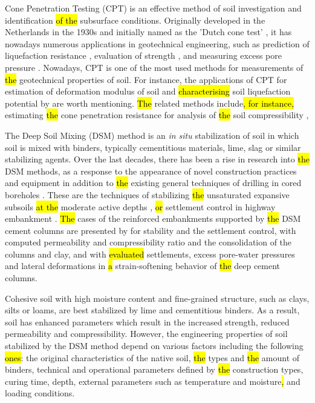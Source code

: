 \documentclass[final,3p,times,onecolumn,authoryear]{elsarticle}
\begin{document}
Cone Penetration Testing (CPT) is an effective method of soil investigation and identification \hl{of the }subsurface conditions. Originally developed in the Netherlands in the 1930s and initially named as the 'Dutch cone test' \citep{brouwer2007situ,mccallum_2014}, it has nowadays numerous applications in geotechnical engineering, such as prediction of liquefaction resistance \citep{Olsen,Fitzgerald,Saye}, evaluation of strength \citep{Priceetal2016,Jamiolkowski}, and measuring excess pore pressure \citep{SullyCampanella,Elsworthetal2006}. Nowadays, CPT is one of the most used methods for measurements of \hl{the }geotechnical properties of soil. For instance, the applications of CPT for estimation of deformation modulus of soil \citep{SHAHIEN2013633,BENZNAVARRETE2022289} and \hl{characterising} soil liquefaction potential by \cite{GUAN20221221} are worth mentioning. \hl{The }related methods include\hl{, for instance,} estimating \hl{the }cone penetration resistance for analysis of \hl{the }soil compressibility \citep{Bishtetal2021}, 

The Deep Soil Mixing (DSM) method is an \emph{in situ} stabilization of soil in which soil is mixed with binders, typically cementitious materials, lime, slag or similar stabilizing agents. Over the last decades, there has been a rise in research into \hl{the }DSM methods, as a response to the appearance of novel construction practices and equipment in addition to \hl{the }existing general techniques of drilling in cored boreholes \citep{Hepton}. These are the techniques of stabilizing \hl{the }unsaturated expansive subsoils \hl{at the} moderate active depths \citep{MadhyannapuPuppala,Madhyannapu}, \hl{or }settlement control in highway embankment \citep{Archeewa}. \hl{The }cases of the reinforced embankments supported by \hl{the }DSM cement columns are presented by \cite{Lambrechts} for stability and the settlement control, \cite{Bergado}
with computed permeability and compressibility ratio and the consolidation of the columns and clay, and \cite{Yapageetal2014} with \hl{evaluated} settlements, excess pore-water pressures and lateral deformations in \hl{a }strain-softening behavior of \hl{the }deep cement columns.

Cohesive soil with high moisture content and fine-grained structure, such as clays, silts or loams, are best stabilized by lime and cementitious binders. As a result, soil has enhanced parameters which result in the increased strength, reduced permeability and compressibility. However, the engineering properties of soil stabilized by the DSM method depend on various factors including the following \hl{ones}: the original characteristics of the native soil, \hl{the }types and \hl{the }amount of binders, technical and operational parameters defined by \hl{the }construction types, curing time, depth, external parameters such as temperature and moisture\hl{, }and loading conditions.
\end{document}
